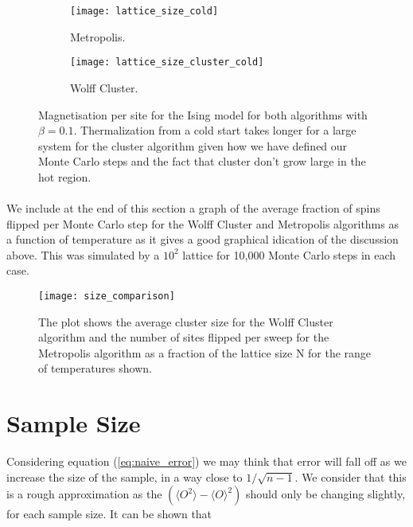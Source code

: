 \documentclass[12pt] {report} %
\begin{document}
			\begin{figure}[H]
				\centering
				\begin{subfigure}[h]{0.49\textwidth}
					\centering
					\texttt{[image: lattice\_size\_cold]}
					\caption{Metropolis.}
					\label{fig:lattice_size_cold}
				\end{subfigure}
				\hfill
				\begin{subfigure}[h]{0.49\textwidth}
					\centering
					\texttt{[image: lattice\_size\_cluster\_cold]}
					\caption{Wolff Cluster.}
					\label{fig:lattice_size_cluster_cold}
				\end{subfigure} 
				\caption{Magnetisation per site for the Ising model for both algorithms with
				$\beta = 0.1$. Thermalization from a cold start takes longer for a large system for the cluster algorithm given how we have defined our Monte Carlo steps and the fact that cluster don't grow large in the hot region.}
				\label{fig:thermalisation_V_size_cold}
			\end{figure}
			
			\paragraph{}
				We include at the end of this section a graph of the average fraction of spins flipped per Monte Carlo step for the Wolff Cluster and Metropolis algorithms as a function of temperature as it gives a good graphical idication of the discussion above. This was simulated by a $10^2$ lattice for 10,000 Monte Carlo steps in each case.
		
			\begin{figure}[H]
				\centering
				\texttt{[image: size\_comparison]}
				\caption{The plot shows the average cluster size for the Wolff Cluster algorithm and the number of sites flipped per sweep for the Metropolis algorithm as a fraction of the lattice size N for the range of temperatures shown.}
				\label{fig:size_comparison}
			\end{figure}		
		
		\section{Sample Size}
			Considering equation (\ref{eq:naive_error}) we may think that error will fall off as we increase the size of the sample, in a way close to $1/\sqrt{n-1}$. We consider that this is a rough approximation as the $(\langle O^2 \rangle - \langle O \rangle^2)$ should only be changing slightly, for each sample size. It can be shown that
			
\end{document}
